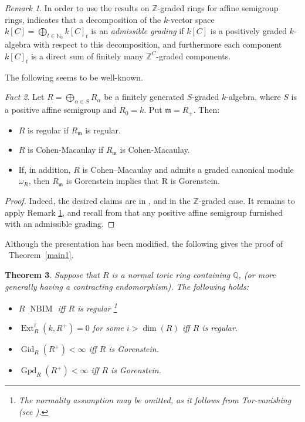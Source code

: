 \documentclass[12pt,reqno]{amsart}
\newtheorem{theorem}{Theorem}[section]
\theoremstyle{definition}
\theoremstyle{remark}
\newtheorem{remark}[theorem]{Remark}
\theoremstyle{cited}
\theoremstyle{remark}
\newtheorem{fact}[theorem]{Fact}
\theoremstyle{citeddef}
\DeclareMathOperator{\Ext}{Ext}
\DeclareMathOperator{\NBIM}{NBIM}
\begin{document}
	\begin{remark}\label{admis}
		In order to use the results on $\mathbb{Z}$-graded rings for affine
		semigroup rings, \cite[Page 260]{BH} indicates that a decomposition
		of the $k$-vector space $k[C]=\bigoplus_{t\in\mathbb{N}_0}k[C]_t$ is an \emph{admissible grading} if $k[C]$ is a positively
		graded $k$-algebra with respect to this decomposition, and furthermore
		each component $k[C]_t$ is a direct sum of finitely many $\mathbb{Z}^C$-graded components. 
	\end{remark}
	The following seems to be well-known.
	\begin{fact} 
		Let \(R=\bigoplus_{\alpha\in S}R_\alpha\) be a finitely generated \(S\)-graded \(k\)-algebra, where \(S\) is a positive affine semigroup and \(R_0=k\). Put
		\(
		\mathfrak m=R_+.
		\) Then:
		\begin{itemize}
			\item[(a)]  $R$  is regular if  $R_{\mathfrak m}$   is regular.
			\item[(b)] $R$  is Cohen-Macaulay if  $R_{\mathfrak m}$   is Cohen-Macaulay.  \item[(c)] If, in addition, \(R\) is Cohen--Macaulay and admits a graded canonical module \(\omega_R\), then
			$R_{\mathfrak m}$  is Gorenstein implies that
			R is Gorenstein.
		\end{itemize}
	\end{fact}
	
	\begin{proof}
		Indeed, the desired claims are in \cite[Ex. 2.2.24~(c)]{BH}, \cite[Ex. 2.1.27~(c)]{BH}
		and \cite[Ex. 3.6.20~(c)]{BH} in the $\mathbb{Z}$-graded case. It remains to apply {Remark} \ref{admis}, and recall from \cite[Proposition 6.1.5]{BH} that
		any  positive affine semigroup  furnished with an admissible
		grading.
	\end{proof}
	
	
	Although the presentation has been modified, the following gives the proof of ~\texorpdfstring{Theorem~\ref{main1}}{Theorem 1}.
	
	\begin{theorem}\label{3.2}
		Suppose that $R$ is a normal toric ring containing $\mathbb{Q}$, (or more generally having a contracting endomorphism). The following holds:
		\begin{itemize}
			\item[(a)] $R$    $\NBIM$ iff $R$ is regular \footnote{The normality assumption may be omitted, as it follows from Tor-vanishing (see \cite[Proposition 4.2]{Shravan}).}
			\item[(b)] 
			\(
			\Ext^i_R(k,R^+)=0
			\)
			for some $i>\dim(R)$ iff $R$ is regular.
			
			\item[(c)]   $\operatorname{Gid}_R(R^+)<\infty$ iff $R$ is Gorenstein.
			
			\item[(d)]   $\operatorname{Gpd}_R(R^+)<\infty$ iff $R$ is Gorenstein.
		\end{itemize} 
	\end{theorem}
	
\end{document}
